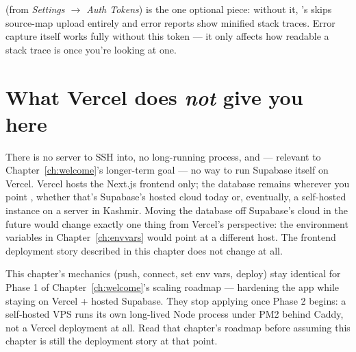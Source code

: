  (from \emph{Settings $\to$ Auth Tokens}) is the one optional piece: without it, 's  skips source-map upload entirely and error reports show minified stack traces. Error capture itself works fully without this token — it only affects how readable a stack trace is once you're looking at one.

\section{What Vercel does \emph{not} give you here}

There is no server to SSH into, no long-running process, and — relevant to Chapter~\ref{ch:welcome}'s longer-term goal — no way to run Supabase itself on Vercel. Vercel hosts the Next.js frontend only; the database remains wherever you point , whether that's Supabase's hosted cloud today or, eventually, a self-hosted instance on a server in Kashmir. Moving the database off Supabase's cloud in the future would change exactly one thing from Vercel's perspective: the environment variables in Chapter~\ref{ch:envvars} would point at a different host. The frontend deployment story described in this chapter does not change at all.

\begin{olknote}
This chapter's mechanics (push, connect, set env vars, deploy) stay identical for Phase 1 of Chapter~\ref{ch:welcome}'s scaling roadmap — hardening the app while staying on Vercel + hosted Supabase. They stop applying once Phase 2 begins: a self-hosted VPS runs its own long-lived Node process under PM2 behind Caddy, not a Vercel deployment at all. Read that chapter's roadmap before assuming this chapter is still the deployment story at that point.
\end{olknote}
